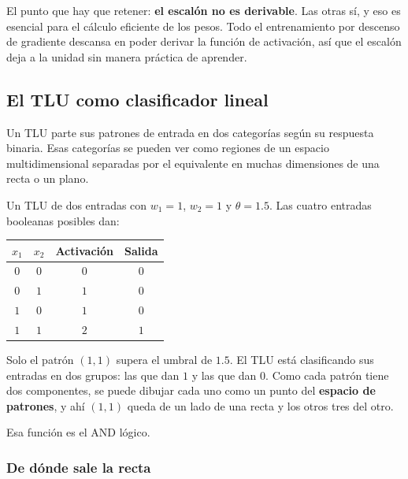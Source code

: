 \documentclass[11pt,letterpaper]{article}
\begin{document}
\begin{ojo}
  El punto que hay que retener: \textbf{el escalón no es derivable}.
  Las otras sí, y eso es esencial para el cálculo eficiente de los
  pesos. Todo el entrenamiento por descenso de gradiente descansa en
  poder derivar la función de activación, así que el escalón deja a
  la unidad sin manera práctica de aprender.
\end{ojo}


\subsection*{El TLU como clasificador lineal}

Un TLU parte sus patrones de entrada en dos categorías según su
respuesta binaria. Esas categorías se pueden ver como regiones de un
espacio multidimensional separadas por el equivalente en muchas
dimensiones de una recta o un plano.

\begin{ejemplo}
  Un TLU de dos entradas con $w_1 = 1$, $w_2 = 1$ y $\theta = 1.5$.
  Las cuatro entradas booleanas posibles dan:

  \begin{center}
  \begin{tabular}{cccc}
    \toprule
    $x_1$ & $x_2$ & \textbf{Activación} & \textbf{Salida} \\
    \midrule
    $0$ & $0$ & $0$ & $0$ \\
    $0$ & $1$ & $1$ & $0$ \\
    $1$ & $0$ & $1$ & $0$ \\
    $1$ & $1$ & $2$ & $1$ \\
    \bottomrule
  \end{tabular}
  \end{center}

  Solo el patrón $(1,1)$ supera el umbral de $1.5$. El TLU está
  clasificando sus entradas en dos grupos: las que dan $1$ y las que
  dan $0$. Como cada patrón tiene dos componentes, se puede dibujar
  cada uno como un punto del \textbf{espacio de patrones}, y ahí
  $(1,1)$ queda de un lado de una recta y los otros tres del otro.

  Esa función es el AND lógico.
\end{ejemplo}

\subsubsection*{De dónde sale la recta}
\end{document}
